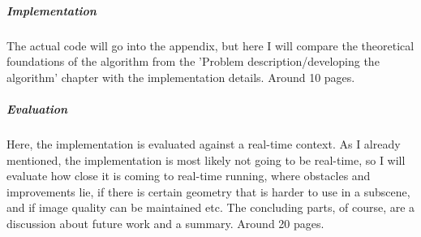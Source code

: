 \subparagraph{Implementation} The actual code will go into the appendix, but here I will compare the theoretical foundations of the algorithm from the 'Problem description/developing the algorithm' chapter with the implementation details. Around 10 pages.

\subparagraph{Evaluation} Here, the implementation is evaluated against a real-time context. As I already mentioned, the implementation is most likely not going to be real-time, so I will evaluate how close it is coming to real-time running, where obstacles and improvements lie, if there is certain geometry that is harder to use in a subscene, and if image quality can be maintained etc. The concluding parts, of course, are a discussion about future work and a summary. Around 20 pages.


